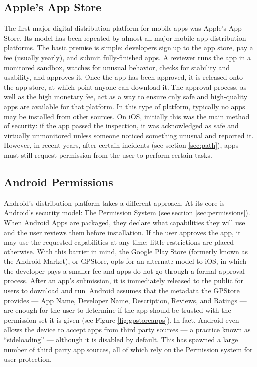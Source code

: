 \subsection{Apple's App Store}
The first major digital distribution platform for mobile apps was Apple's App Store\citep{AppleAppStore}. Its model has been repeated by almost all major mobile app distribution platforms. The basic premise is simple: developers sign up to the app store, pay a fee (usually yearly), and submit fully-finished apps. A reviewer runs the app in a monitored sandbox, watches for unusual behavior, checks for stability and usability, and approves it. Once the app has been approved, it is released onto the app store, at which point anyone can download it. The approval process, as well as the high monetary fee, act as a way to ensure only safe and high-quality apps are available for that platform. In this type of platform, typically no apps may be installed from other sources. On iOS, initially this was the main method of security: if the app passed the inspection, it was acknowledged as safe and virtually unmonitored unless someone noticed something unusual and reported it. However, in recent years, after certain incidents (see section \ref{sec:path}), apps must still request permission from the user to perform certain tasks.

\subsection{Android Permissions}
Android's distribution platform takes a different approach. At its core is Android's security model: The Permission System (see section \ref{sec:permissions}). When Android Apps are packaged, they declare what capabilities they will use and the user reviews them before installation. If the user approves the app, it may use the requested capabilities at any time: little restrictions are placed otherwise. With this barrier in mind, the Google Play Store (formerly known as the Android Market), or GPStore, opts for an alternate model to iOS, in which the developer pays a smaller fee and apps do not go through a formal approval process. After an app's submission, it is immediately released to the public for users to download and run. Android assumes that the metadata the GPStore provides --- App Name, Developer Name, Description, Reviews, and Ratings --- are enough for the user to determine if the app should be trusted with the permission set it is given (see Figure \ref{fig:gpstoreapps}). In fact, Android even allows the device to accept apps from third party sources --- a practice known as ``sideloading'' --- although it is disabled by default. This has spawned a large number of third party app sources, all of which rely on the Permission system for user protection.

